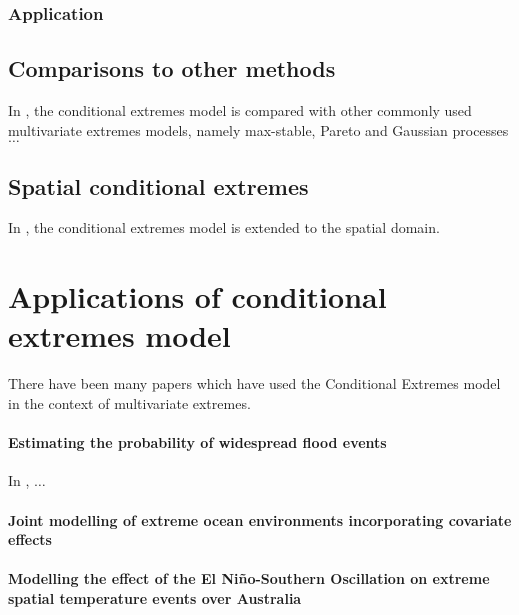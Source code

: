 \documentclass{article}
\numberwithin{equation}{section}
\begin{document}
\subsubsection{Application}


\subsection{Comparisons to other methods}

In \cite{Tawn2018}, the conditional extremes model is compared with other commonly used multivariate extremes models, namely max-stable, Pareto and Gaussian processes $\ldots$

\subsection{Spatial conditional extremes}

In \cite{Wadsworth2018}, the conditional extremes model is extended to the spatial domain. 


\newpage
\section{Applications of conditional extremes model}\label{sec:ce_applications}

There have been many papers which have used the Conditional Extremes model in the context of multivariate extremes. 

\paragraph{Estimating the probability of widespread flood events}
In \cite{Keef2012_flooding}, $\ldots$

\paragraph{Joint modelling of extreme ocean environments incorporating covariate effects}

\paragraph{Modelling the effect of the El Niño-Southern Oscillation on extreme spatial temperature events over Australia}
\end{document}
